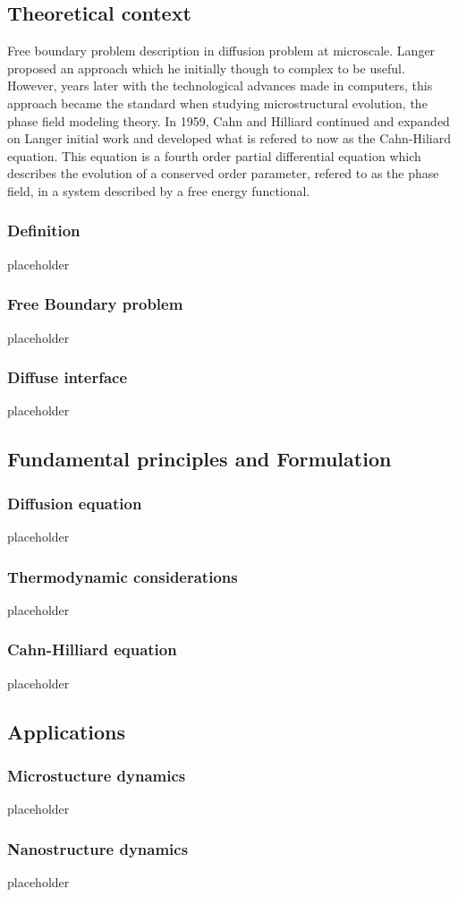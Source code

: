 \subsection{Theoretical context}
    Free boundary problem description in diffusion problem at microscale. Langer proposed an approach which he initially though to complex to be useful. However, years later with the technological advances made in computers, this approach became the standard when studying microstructural evolution, the phase field modeling theory. In 1959, Cahn and Hilliard continued and expanded on Langer initial work and developed what is refered to now as the Cahn-Hiliard equation. This equation is a fourth order partial differential equation which describes the evolution of a conserved order parameter, refered to as the phase field, in a system described by a free energy functional.
    \subsubsection{Definition}
        placeholder
    \subsubsection{Free Boundary problem}
        placeholder
    \subsubsection{Diffuse interface}
        placeholder
\subsection{Fundamental principles and Formulation}
    \subsubsection{Diffusion equation}
        placeholder
    \subsubsection{Thermodynamic considerations}
        placeholder
    \subsubsection{Cahn-Hilliard equation}
        placeholder
\subsection{Applications}
    \subsubsection{Microstucture dynamics}
        placeholder
    \subsubsection{Nanostructure dynamics}
        placeholder